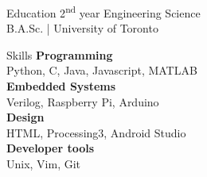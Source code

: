 \documentclass{my_resume} %
\begin{document}
\begin{minipage}[t]{0.33\textwidth}
    \begin{rSection}{Education}
        2\textsuperscript{nd} year Engineering Science\\
        B.A.Sc. | University of Toronto\\
    \end{rSection}
    \begin{rSection}{Skills}
        {\bf Programming }\\ 
        Python, C, Java, Javascript, MATLAB\\
        {\bf Embedded Systems } \\
        Verilog, Raspberry Pi, Arduino \\
        {\bf Design }\\ 
        HTML, Processing3, Android Studio\\ 
        {\bf Developer tools}\\
         Unix, Vim, Git
    \end{rSection}
\end{minipage}
\end{document}

